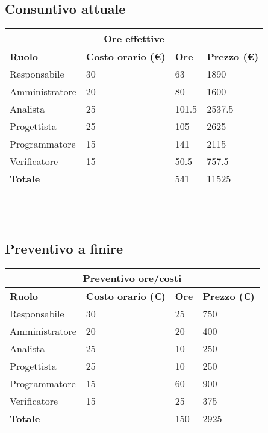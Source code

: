 \documentclass[a4paper, 12pt]{article}
\begin{document}
\subsection{Consuntivo attuale}
\begin{center}
    \begin{tabularx}{\textwidth}{|X|X|X|X|}
        \hline
        \multicolumn{4}{|c|}{\textbf{Ore effettive}}\\
        \hline
        \hline
        \textbf{Ruolo} & \textbf{Costo orario (\euro)} & \textbf{Ore} & \textbf{Prezzo (\euro)}\\
        \hline
        Responsabile    & 30 & 63  & 1890\\
        \hline
        Amministratore  & 20 & 80  & 1600\\
        \hline
        Analista        & 25 & 101.5  & 2537.5 \\
        \hline
        Progettista     & 25 & 105  & 2625\\
        \hline
        Programmatore   & 15 & 141  & 2115\\
        \hline
        Verificatore    & 15 & 50.5  & 757.5 \\
        \hline
        \hline
        \textbf{Totale} &    & 541 & 11525\\
        \hline
    \end{tabularx}\\[8pt]
    \mbox{}\\
\end{center}

\subsection{Preventivo a finire}
\begin{center}
    \begin{tabularx}{\textwidth}{|X|X|X|X|}
        \hline
        \multicolumn{4}{|c|}{\textbf{Preventivo ore/costi}}\\
        \hline
        \hline
        \textbf{Ruolo} & \textbf{Costo orario (\euro)} & \textbf{Ore} & \textbf{Prezzo (\euro)}\\
        \hline
        Responsabile    & 30 & 25  & 750\\
        \hline
        Amministratore  & 20 & 20  & 400\\
        \hline
        Analista        & 25 & 10  & 250\\
        \hline
        Progettista     & 25 & 10  & 250\\
        \hline
        Programmatore   & 15 & 60  & 900\\
        \hline
        Verificatore    & 15 & 25  & 375\\
        \hline
        \hline
        \textbf{Totale} &    & 150 & 2925\\
        \hline
    \end{tabularx}\\[8pt]
    \mbox{}\\
\end{center}
\end{document}
